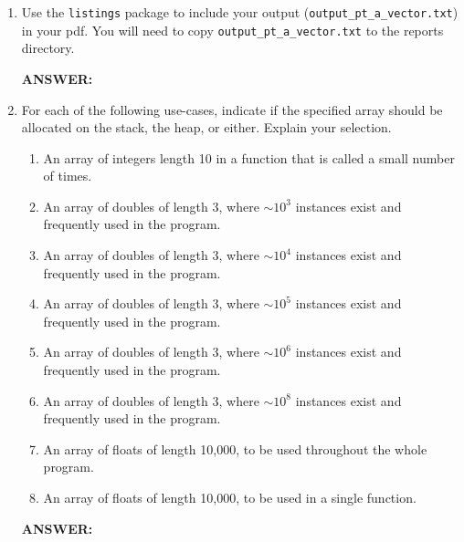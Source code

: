 \begin{enumerate}
    \item Use the \texttt{listings} package to include your output (\texttt{output\_pt\_a\_vector.txt}) in your pdf.  You will need to copy \texttt{output\_pt\_a\_vector.txt} to the reports directory.

    \textbf{ANSWER:} %
    
    

    \item For each of the following use-cases, indicate if the specified array should be allocated on the stack, the heap, or either.  Explain your selection.
    \begin{enumerate}
        \item An array of integers length 10 in a function that is called a small number of times.
        \item An array of doubles of length 3, where $\sim 10^3$ instances exist and frequently used in the program.
        \item An array of doubles of length 3, where $\sim 10^4$ instances exist and frequently used in the program.
        \item An array of doubles of length 3, where $\sim 10^5$ instances exist and frequently used in the program.
        \item An array of doubles of length 3, where $\sim 10^6$ instances exist and frequently used in the program.
        \item An array of doubles of length 3, where $\sim 10^8$ instances exist and frequently used in the program.
        \item An array of floats of length 10,000, to be used throughout the whole program.
        \item An array of floats of length 10,000, to be used in a single function.
    \end{enumerate}

    \textbf{ANSWER:} %



\end{enumerate}
